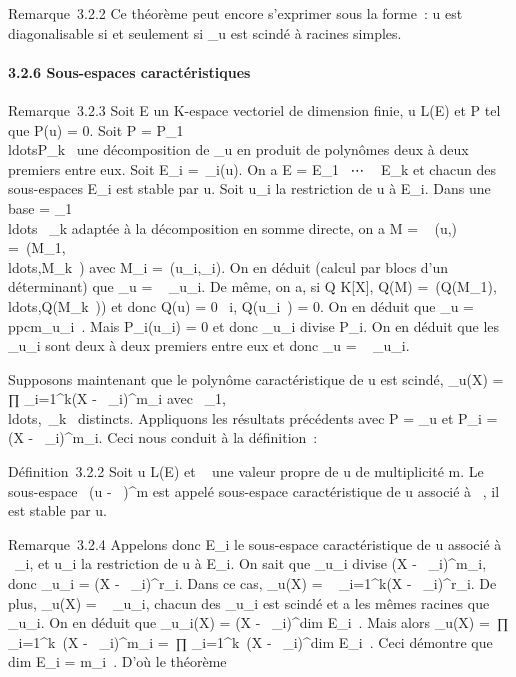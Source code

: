 \documentclass[]{article}
\begin{document}
Remarque~3.2.2 Ce théorème peut encore s'exprimer sous la forme~: u est
diagonalisable si et seulement si \mu\_u est scindé à racines
simples.

\paragraph{3.2.6 Sous-espaces caractéristiques}

Remarque~3.2.3 Soit E un K-espace vectoriel de dimension finie, u \in L(E)
et P tel que P(u) = 0. Soit P =
P\_1\\ldotsP\_k~
une décomposition de \chi\_u en produit de polynômes deux à deux
premiers entre eux. Soit E\_i =\
\mathrmKerP\_i(u). On a E = E\_1
\oplus~⋯ \oplus~ E\_k et chacun des sous-espaces
E\_i est stable par u. Soit u\_i la restriction de u à
E\_i. Dans une base  = \mathcal{E}\_1
\cup\\ldots~
\cup{}\_k adaptée à la décomposition en somme directe, on a M
= \mathrmMat~ (u,\mathcal{E})
=\
\mathrmdiag(M\_1,\\ldots,M\_k~)
avec M\_i =\
\mathrmMat (u\_i,\_i). On en
déduit (calcul par blocs d'un déterminant) que \chi\_u
= \∏ ~
\chi\_u\_i. De même, on a, si Q \in K{[}X{]}, Q(M)
=\
\mathrmdiag(Q(M\_1),\\ldots,Q(M\_k~))
et donc Q(u) = 0 \Leftrightarrow
\forall~i, Q(u\_i~) = 0. On en déduit que
\mu\_u = ppcm\mu\_u\_i~.
Mais P\_i(u\_i) = 0 et donc \mu\_u\_i
divise P\_i. On en déduit que les \mu\_u\_i sont
deux à deux premiers entre eux et donc \mu\_u
= \∏ ~
\mu\_u\_i.

Supposons maintenant que le polynôme caractéristique de u est scindé,
\chi\_u(X) = \\∏
 \_i=1^k(X - \lambda~\_i)^m\_i avec
\lambda~\_1,\\ldots,\lambda~\_k~
distincts. Appliquons les résultats précédents avec P = \chi\_u et
P\_i = (X - \lambda~\_i)^m\_i. Ceci nous
conduit à la définition~:

Définition~3.2.2 Soit u \in L(E) et \lambda~ une valeur propre de u de
multiplicité m. Le sous-espace
\mathrmKer~(u -
\lambda~\mathrmId)^m est appelé sous-espace
caractéristique de u associé à \lambda~, il est stable par u.

Remarque~3.2.4 Appelons donc E\_i le sous-espace caractéristique
de u associé à \lambda~\_i, et u\_i la restriction de u à
E\_i. On sait que \mu\_u\_i divise (X -
\lambda~\_i)^m\_i, donc \mu\_u\_i = (X
- \lambda~\_i)^r\_i. Dans ce cas, \mu\_u(X)
= \∏ ~
\_i=1^k(X - \lambda~\_i)^r\_i. De plus,
\chi\_u(X) = \∏ ~
\chi\_u\_i, chacun des \chi\_u\_i est scindé
et a les mêmes racines que \mu\_u\_i. On en déduit que
\chi\_u\_i(X) = (X -
\lambda~\_i)^dim E\_i~. Mais
alors \chi\_u(X) =\
∏  \_i=1^k~(X -
\lambda~\_i)^m\_i =\
∏ \_i=1^k~(X -
\lambda~\_i)^dim E\_i~. Ceci
démontre que dim E\_i = m\_i~.
D'où le théorème
\end{document}
